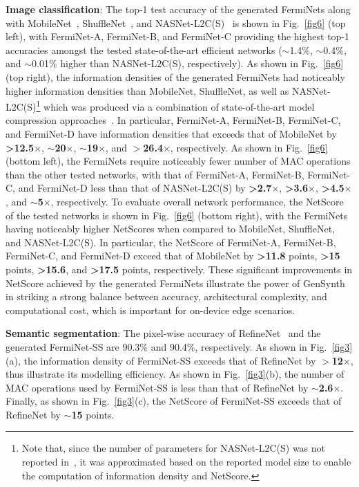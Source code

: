 \documentclass{article}
\begin{document}
\textbf{Image classification}: The top-1 test accuracy of the generated FermiNets along with MobileNet~\cite{MobileNet}, ShuffleNet~\cite{ShuffleNet}, and NASNet-L2C(S)~\cite{L2C} is shown in Fig.~\ref{fig6} (top left), with FermiNet-A, FermiNet-B, and FermiNet-C providing the highest top-1 accuracies amongst the tested state-of-the-art efficient networks ($\sim$1.4\%, $\sim$0.4\%, and $\sim$0.01\% higher than NASNet-L2C(S), respectively).  As shown in Fig.~\ref{fig6} (top right), the information densities of the generated FermiNets had noticeably higher information densities than MobileNet, ShuffleNet, as well as NASNet-L2C(S)\footnote{Note that, since the number of parameters for NASNet-L2C(S) was not reported in~\cite{L2C}, it was approximated based on the reported model size to enable the computation of information density and NetScore.} which was produced via a combination of state-of-the-art model compression approaches~\cite{Jacob,distillation,projectionnet}.  In particular, FermiNet-A, FermiNet-B, FermiNet-C, and FermiNet-D have information densities that exceeds that of MobileNet by \textbf{>12.5$\times$}, \textbf{$\sim$20$\times$}, \textbf{$\sim$19$\times$}, and \textbf{$>$26.4$\times$}, respectively.  As shown in Fig.~\ref{fig6} (bottom left), the FermiNets require noticeably fewer number of MAC operations than the other tested networks, with that of FermiNet-A, FermiNet-B, FermiNet-C, and FermiNet-D less than that of NASNet-L2C(S) by \textbf{>2.7$\times$}, \textbf{>3.6$\times$}, \textbf{>4.5$\times$}, and \textbf{$\sim$5$\times$}, respectively.  To evaluate overall network performance, the NetScore of the tested networks is shown in Fig.~\ref{fig6} (bottom right), with the FermiNets having noticeably higher NetScores when compared to MobileNet, ShuffleNet, and NASNet-L2C(S).  In particular, the NetScore of FermiNet-A, FermiNet-B, FermiNet-C, and FermiNet-D exceed that of MobileNet by \textbf{>11.8} points, \textbf{>15} points, \textbf{>15.6}, and \textbf{>17.5} points, respectively.  These significant improvements in NetScore achieved by the generated FermiNets illustrate the power of GenSynth in striking a strong balance between accuracy, architectural complexity, and computational cost, which is important for on-device edge scenarios.

\textbf{Semantic segmentation}: The pixel-wise accuracy of RefineNet~\cite{RefineNet} and the generated FermiNet-SS are 90.3\% and 90.4\%, respectively.  As shown in Fig.~\ref{fig3}(a), the information density of FermiNet-SS exceeds that of RefineNet by \textbf{$>$12$\times$}, thus illustrate its modelling efficiency.  As shown in Fig.~\ref{fig3}(b), the number of MAC operations used by FermiNet-SS is less than that of RefineNet by \textbf{$\sim$2.6$\times$}.  Finally, as shown in Fig.~\ref{fig3}(c), the NetScore of FermiNet-SS exceeds that of RefineNet by \textbf{$\sim$15} points.
\end{document}

